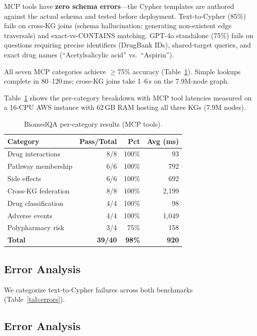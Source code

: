 \documentclass[sigconf]{acmart}
\begin{document}
MCP tools have \textbf{zero schema errors}---the Cypher
templates are authored against the actual schema and tested
before deployment.  Text-to-Cypher (85\%) fails on cross-KG
joins (schema hallucination: generating non-existent edge
traversals) and exact-vs-CONTAINS matching.
GPT-4o standalone (75\%) fails on questions requiring precise
identifiers (DrugBank IDs), shared-target queries, and exact
drug names (``Acetylsalicylic acid'' vs.\ ``Aspirin'').

All seven MCP categories achieve $\geq$75\% accuracy
(Table~\ref{tab:biomedqa_cats}).  Simple lookups complete in
80--120\,ms; cross-KG joins take 1--6\,s on the 7.9M-node
graph.

Table~\ref{tab:biomedqa_cats} shows the per-category breakdown
with MCP tool latencies measured on a 16-CPU AWS instance
with 62\,GB RAM hosting all three KGs (7.9M nodes).

\begin{table}[t]
\centering
\caption{BiomedQA per-category results (MCP tools).}
\label{tab:biomedqa_cats}
\small
\begin{tabular}{@{}lrrr@{}}
\toprule
\textbf{Category} & \textbf{Pass/Total} & \textbf{Pct} & \textbf{Avg (ms)} \\
\midrule
Drug interactions    & 8/8  & 100\% &   93 \\
Pathway membership   & 6/6  & 100\% &  792 \\
Side effects         & 6/6  & 100\% &  692 \\
Cross-KG federation  & 8/8  & 100\% & 2,199 \\
Drug classification  & 4/4  & 100\% &   98 \\
Adverse events       & 4/4  & 100\% & 1,049 \\
Polypharmacy risk    & 3/4  &  75\% &  158 \\
\midrule
\textbf{Total}       & \textbf{39/40} & \textbf{98\%} & \textbf{920} \\
\bottomrule
\end{tabular}
\end{table}

\subsection{Error Analysis}

We categorize text-to-Cypher failures across both benchmarks
(Table~\ref{tab:errors}).

\subsection{Error Analysis}
\end{document}
